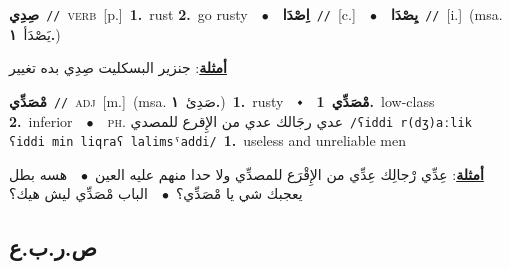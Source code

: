 \documentclass[10pt,a4paper,twoside]{article} %
\begin{document}
\begin{multicols}{2}
{\setlength\topsep{0pt}\textbf{\foreignlanguage{arabic}{صِدِي}}\ {\color{gray}\texttt{//}\color{black}}\ \textsc{verb}\ [p.]\ \textbf{1.}~rust  \textbf{2.}~go rusty\ \ $\bullet$\ \ \setlength\topsep{0pt}\textbf{\foreignlanguage{arabic}{اِصْدَا}}\ {\color{gray}\texttt{//}\color{black}}\ [c.]\ \ $\bullet$\ \ \setlength\topsep{0pt}\textbf{\foreignlanguage{arabic}{يِصْدَا}}\ {\color{gray}\texttt{//}\color{black}}\ [i.]\ \color{gray}(msa. \foreignlanguage{arabic}{يَصْدَأ}~\foreignlanguage{arabic}{\textbf{١.}})\color{black}\  \begin{flushright}\color{gray}\foreignlanguage{arabic}{\textbf{\underline{\foreignlanguage{arabic}{أمثلة}}}: جنزير البسكليت صِدِي بده تغيير}\end{flushright}\color{black}} \vspace{2mm}

{\setlength\topsep{0pt}\textbf{\foreignlanguage{arabic}{مْصَدِّي}}\ {\color{gray}\texttt{//}\color{black}}\ \textsc{adj}\ [m.]\ \color{gray}(msa. \foreignlanguage{arabic}{صَدِئ}~\foreignlanguage{arabic}{\textbf{١.}})\color{black}\ \textbf{1.}~rusty\ \ $\smblkdiamond$\ \ \setlength\topsep{0pt}\textbf{\foreignlanguage{arabic}{مْصَدِّي}}\ \textbf{1.}~low-class  \textbf{2.}~inferior\ \ $\bullet$\ \ \textsc{ph.} \color{gray} \foreignlanguage{arabic}{عدي رجَالك عدي من الإِقرع للمصدي}\color{black}\ {\color{gray}\texttt{/{\sffamily ʕiddi r(dʒ)aːlik ʕiddi min liqraʕ lalimsˤaddi}/}\color{black}}\ \textbf{1.}~useless and unreliable men\  \begin{flushright}\color{gray}\foreignlanguage{arabic}{\textbf{\underline{\foreignlanguage{arabic}{أمثلة}}}: عِدِّي رْجالِك عِدِّي من الإِقْرَع للمصدِّي ولا حدا منهم عليه العين\ $\bullet$\ \  هسه بطل يعجبك شي يا مْصَدِّي؟\ $\bullet$\ \  الباب مْصَدِّي ليش هيك؟}\end{flushright}\color{black}} \vspace{2mm}

\vspace{-3mm}
\subsection*{\color{blue}\foreignlanguage{arabic}{ص.ر.ب.ع}\color{blue}{}} 


\end{multicols}
\end{document}
